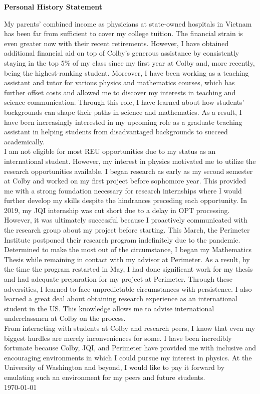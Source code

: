 \documentclass[12pt]{article}
\begin{document}
\begin{center}
	\textbf{Personal History Statement}
\end{center}
My parents' combined income as physicians at state-owned hospitals in Vietnam has been far from sufficient to cover my college tuition. The financial strain is even greater now with their recent retirements. However,  I have obtained additional financial aid on top of Colby's generous assistance by consistently staying in the top 5\% of my class since my first year at Colby and, more recently, being the highest-ranking student. Moreover, I have been working as a teaching assistant and tutor for various physics and mathematics courses, which has further offset costs and allowed me to discover my interests in teaching and science communication. Through this role, I have learned about how students' backgrounds can shape their paths in science and mathematics. As a result, I have been increasingly interested in my upcoming role as a graduate teaching assistant in helping students from disadvantaged backgrounds to succeed academically. \\

I am not eligible for most REU opportunities due to my status as an international student. However, my interest in physics motivated me to utilize the research opportunities available. I began research as early as my second semester at Colby and worked on my first project before sophomore year. This provided me with a strong foundation necessary for research internships where I would further develop my skills despite the hindrances preceding each opportunity. In 2019, my JQI internship was cut short due to a delay in OPT processing. However, it was ultimately successful because I proactively communicated with the research group about my project before starting. This March, the Perimeter Institute postponed their research program indefinitely due to the pandemic. Determined to make the most out of the circumstance, I began my Mathematics Thesis while remaining in contact with my advisor at Perimeter. As a result, by the time the program restarted in May, I had done significant work for my thesis and had adequate preparation for my project at Perimeter. Through these adversities, I learned to face unpredictable circumstances with persistence. I also learned a great deal about obtaining research experience as an international student in the US. This knowledge allows me to advise international underclassmen at Colby on the process.\\

From interacting with students at Colby and research peers, I know that even my biggest hurdles are merely inconveniences for some. I have been incredibly fortunate because Colby, JQI, and Perimeter have provided me with inclusive and encouraging environments in which I could pursue my interest in physics. At the University of Washington and beyond, I would like to pay it forward by emulating such an environment for my peers and future students.\\

\noindent \today
\end{document}
